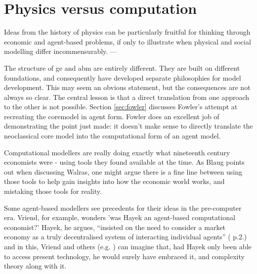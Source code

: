 \section{Physics versus computation \label{sec:phys_vs_comp}}

Ideas from the history of physics can be particularly fruitful for thinking through economic and agent-based problems, if only to illustrate when physical and social modelling differ incommensurably.
---

The structure of \gls{ge} and \gls{abm} are entirely different. They are built on different foundations, and consequently have developed separate philosophies for model development. This may seem an obvious statement, but the consequences are not always so clear. The central lesson is that a direct translation from one approach to the other is not possible. Section \ref{sec:fowler} discusses Fowler's attempt at recreating the \gls{coremodel} in agent form. Fowler does an excellent job of demonstrating the point just made: it doesn't make sense to directly translate the neoclassical core model into the computational form of an agent model.

Computational modellers are really doing exactly what nineteenth century economists were - using tools they found available at the time. As Blaug points out  when discussing Walras, one might argue there is a fine line between using those tools to help gain insights into how the economic world works, and mistaking those tools for reality. 

Some agent-based modellers see precedents for their ideas in the pre-computer era. Vriend, for example, wonders 'was Hayek an agent-based computational economist?' Hayek, he argues, ``insisted on the need to consider a market economy as a truly decentralised system of interacting individual agents'' (\citealt{vriend_was_2002} p.2.) and in this, Vriend and others (e.g. \citealt{miller_complex_2007}) can imagine that, had Hayek only been able to access present technology, he would surely have embraced it, and complexity theory along with it.

